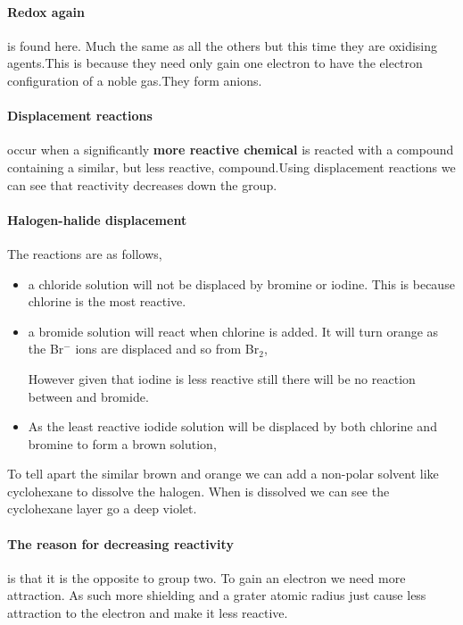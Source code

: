 \paragraph{Redox again} is found here. Much the same as all the others but this time they are oxidising agents.This is because they need only gain one electron to have the electron configuration of a noble gas.They form anions.
	
	\paragraph{Displacement reactions} occur when a significantly \textbf{more reactive chemical} is reacted with a compound containing a similar, but less reactive, compound.Using displacement reactions we can see that reactivity decreases down the group.
\paragraph{Halogen-halide displacement} The reactions are as follows,
	\begin{itemize}
		\item a chloride solution will not be displaced by bromine or iodine. This is because chlorine is the most reactive.
		\item a bromide solution will react when chlorine is added. It will turn orange as the Br$^-$ ions are displaced and so from Br$_2$,
		
			However given that iodine is less reactive still there will be no reaction between  and bromide.
		\item As the least reactive iodide solution will be displaced by both chlorine and bromine to form a brown solution,
		
			
	\end{itemize}
	To tell apart the similar brown and orange we can add a non-polar solvent like cyclohexane to dissolve the halogen.
	When  is dissolved we can see the cyclohexane layer go a deep violet.
	
	\paragraph{The reason for decreasing reactivity} is that it is the opposite to group two.
	To gain an electron we need more attraction.
	As such more shielding and a grater atomic radius just cause less attraction to the electron and make it less reactive.
	
